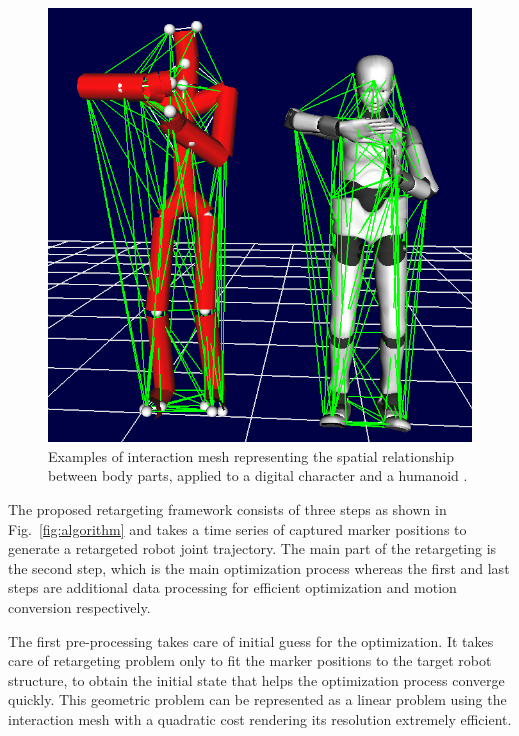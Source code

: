 \documentclass[letterpaper, 10 pt, conference]{ieeeconf}  %
\begin{document}
\begin{figure}[b]
\begin{center}
  \includegraphics[width=0.8 \linewidth]{figure/InteractionMeshImage.png}
  \caption{Examples of interaction mesh representing the spatial
    relationship between body parts, applied to a digital character and a
    humanoid .} 
  \label{fig:interaction-mesh}
\end{center}
\end{figure}

The proposed retargeting framework consists of three steps as shown in
Fig.~\ref{fig:algorithm} and  
takes a time series of captured marker positions to
generate a retargeted robot joint trajectory.  
The main part of the retargeting is the second step, which is the main
optimization process whereas the first and last steps are additional
data processing for efficient optimization and motion conversion
respectively. 

The first pre-processing takes care of initial guess for the
optimization. It takes care of retargeting problem only to fit the
marker positions to the target robot structure, to obtain the initial
state that helps the optimization process converge quickly.
This geometric problem can be represented as a
linear problem using the interaction mesh \cite{Komura10}
with a quadratic cost rendering its resolution
extremely efficient.
\end{document}
